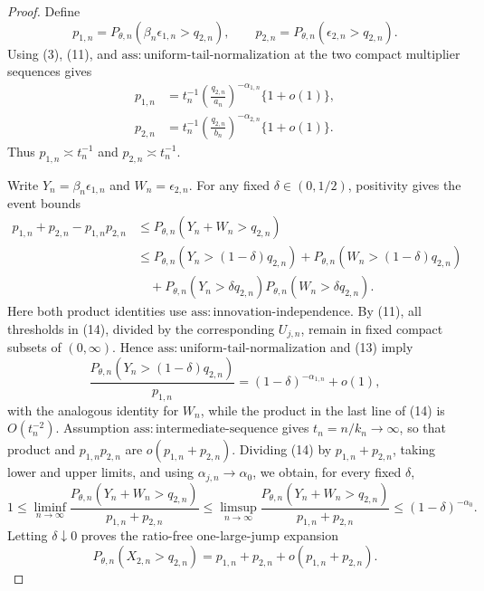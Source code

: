 \documentclass{article}
\begin{document}
\begin{proof}
Define
\[
p_{1,n}=P_{\theta,n}(\beta_n\epsilon_{1,n}>q_{2,n}),
\qquad
p_{2,n}=P_{\theta,n}(\epsilon_{2,n}>q_{2,n}).
\tag{12}
\]
Using (3), (11), and \(\mathrm{ass{:}uniform\text{-}tail\text{-}normalization}\) at the two compact multiplier sequences gives
\[
\begin{aligned}
p_{1,n}
&=t_n^{-1}\left(\frac{q_{2,n}}{a_n}\right)^{-\alpha_{1,n}}\{1+o(1)\},\\
p_{2,n}
&=t_n^{-1}\left(\frac{q_{2,n}}{b_n}\right)^{-\alpha_{2,n}}\{1+o(1)\}.
\end{aligned}
\tag{13}
\]
Thus \(p_{1,n}\asymp t_n^{-1}\) and \(p_{2,n}\asymp t_n^{-1}\).

Write \(Y_n=\beta_n\epsilon_{1,n}\) and \(W_n=\epsilon_{2,n}\). For any fixed \(\delta\in(0,1/2)\), positivity gives the event bounds
\[
\begin{aligned}
p_{1,n}+p_{2,n}-p_{1,n}p_{2,n}
&\leq P_{\theta,n}(Y_n+W_n>q_{2,n})\\
&\leq P_{\theta,n}(Y_n>(1-\delta)q_{2,n})
+P_{\theta,n}(W_n>(1-\delta)q_{2,n})\\
&\quad+P_{\theta,n}(Y_n>\delta q_{2,n})
P_{\theta,n}(W_n>\delta q_{2,n}).
\end{aligned}
\tag{14}
\]
Here both product identities use \(\mathrm{ass{:}innovation\text{-}independence}\). By (11), all thresholds in (14), divided by the corresponding \(U_{j,n}\), remain in fixed compact subsets of \((0,\infty)\). Hence \(\mathrm{ass{:}uniform\text{-}tail\text{-}normalization}\) and (13) imply
\[
\frac{P_{\theta,n}(Y_n>(1-\delta)q_{2,n})}{p_{1,n}}
=(1-\delta)^{-\alpha_{1,n}}+o(1),
\tag{15}
\]
with the analogous identity for \(W_n\), while the product in the last line of (14) is \(O(t_n^{-2})\). Assumption \(\mathrm{ass{:}intermediate\text{-}sequence}\) gives \(t_n=n/k_n\to\infty\), so that product and \(p_{1,n}p_{2,n}\) are \(o(p_{1,n}+p_{2,n})\). Dividing (14) by \(p_{1,n}+p_{2,n}\), taking lower and upper limits, and using \(\alpha_{j,n}\to\alpha_0\), we obtain, for every fixed \(\delta\),
\[
1\leq\liminf_{n\to\infty}
\frac{P_{\theta,n}(Y_n+W_n>q_{2,n})}{p_{1,n}+p_{2,n}}
\leq\limsup_{n\to\infty}
\frac{P_{\theta,n}(Y_n+W_n>q_{2,n})}{p_{1,n}+p_{2,n}}
\leq(1-\delta)^{-\alpha_0}.
\]
Letting \(\delta\downarrow0\) proves the ratio-free one-large-jump expansion
\[
P_{\theta,n}(X_{2,n}>q_{2,n})
=p_{1,n}+p_{2,n}+o(p_{1,n}+p_{2,n}).
\tag{16}
\]


\end{proof}
\end{document}
